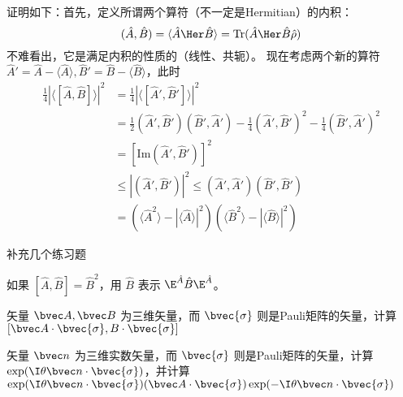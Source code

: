 证明如下：首先，定义所谓两个算符（不一定是Hermitian）的内积：
\begin{equation}
(\hat A, \hat B)=\langle\hat A\Her\hat B\rangle = \text{Tr}(\hat A\Her\hat B\hat\rho)
\end{equation}
不难看出，它是满足内积的性质的（线性、共轭）。
现在考虑两个新的算符 $\hat A'=\hat A-\langle\hat A\rangle, \hat B'=\hat B-\langle\hat B\rangle$，此时
\begin{equation}
\begin{split}
\frac{1}{4}|\langle[\hat A,\hat B]\rangle|^2&=\frac{1}{4}|\langle[\hat A',\hat B']\rangle|^2 \\
&=\frac{1}{2}(\hat A',\hat B')(\hat B',\hat A')-\frac{1}{4}(\hat A',\hat B')^2-\frac{1}{4}(\hat B',\hat A')^2\\
&=[\text{Im}(\hat A',\hat B')]^2\\
&\le |(\hat A',\hat B')|^2\le(\hat A',\hat A')(\hat B',\hat B')\\
&=(\langle\hat A^2\rangle - |\langle\hat A\rangle|^2)(\langle\hat B^2\rangle - |\langle\hat B\rangle|^2)
\end{split}
\end{equation}

补充几个练习题

\begin{exercise}{}
如果 $[\hat A,\hat B]=\hat B^2$，用 $\hat B$ 表示 $\E^{\hat A}\hat B \E^{\hat A}$。
\end{exercise}

\begin{exercise}{}
矢量 $\bvec A, \bvec B$ 为三维矢量，而 $\bvec{\sigma}$ 则是Pauli矩阵的矢量，计算 $[\bvec A\cdot\bvec{\sigma}, B\cdot\bvec{\sigma}]$
\end{exercise}

\begin{exercise}{}
矢量 $\bvec n$ 为三维实数矢量，而 $\bvec{\sigma}$ 则是Pauli矩阵的矢量，计算 $\exp(\I\theta\bvec n\cdot\bvec{\sigma})$，并计算 $\exp(\I\theta\bvec n\cdot\bvec{\sigma})(\bvec A\cdot\bvec{\sigma})\exp(-\I\theta\bvec n\cdot\bvec{\sigma})$
\end{exercise}